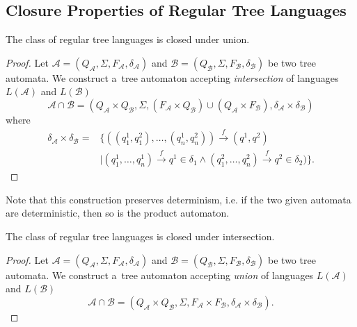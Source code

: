 

\subsection{Closure Properties of Regular Tree Languages}\label{ta-closures}

\begin{theorem}
 The class of regular tree languages is closed under union.
\end{theorem}

\begin{proof}
Let $\mathcal{A} = (Q_\mathcal{A}, \Sigma, F_\mathcal{A}, \delta_\mathcal{A})$
and $\mathcal{B} = (Q_\mathcal{B}, \Sigma, F_\mathcal{B}, \delta_\mathcal{B})$
be two tree automata. We construct a~tree automaton accepting
\emph{intersection} of languages $L(\mathcal{A})$ and $L(\mathcal{B})$  
\begin{equation}
\mathcal{A} \cap \mathcal{B}
= (Q_\mathcal{A} \times Q_\mathcal{B}, \Sigma, (F_\mathcal{A} \times
Q_\mathcal{B}) \cup (Q_\mathcal{A} \times F_\mathcal{B}), \delta_\mathcal{A}
\times \delta_\mathcal{B})
\end{equation} where
 \begin{align}
 \delta_\mathcal{A} \times \delta_\mathcal{B} = &\{
 ((q^1_1,q^2_1),\ldots,(q^1_n,q^2_n)) \overset{f}{\longrightarrow} (q^1,
 q^2)\nonumber \\
  & \mid (q^1_1,\ldots,q^1_n) \overset{f}{\longrightarrow} q^1 \in \delta_1
  \wedge (q^2_1,\ldots,q^2_n) \overset{f}{\longrightarrow} q^2 \in \delta_2)\}.
	\end{align}
\end{proof}

Note that this construction preserves determinism, i.e. if the two given
automata are deterministic, then so is the product automaton.
\begin{theorem}
 The class of regular tree languages is closed under intersection.
\end{theorem}

\begin{proof}
Let $\mathcal{A} = (Q_\mathcal{A}, \Sigma, F_\mathcal{A}, \delta_\mathcal{A})$
and $\mathcal{B} = (Q_\mathcal{B}, \Sigma, F_\mathcal{B}, \delta_\mathcal{B})$
be two tree automata. We construct a~tree automaton accepting \emph{union}
of languages $L(\mathcal{A})$ and $L(\mathcal{B})$ 
\begin{equation}
\mathcal{A} \cap
\mathcal{B} = (Q_\mathcal{A} \times Q_\mathcal{B}, \Sigma, F_\mathcal{A} \times
F_\mathcal{B}, \delta_\mathcal{A} \times \delta_\mathcal{B}).
\end{equation}
\end{proof}

